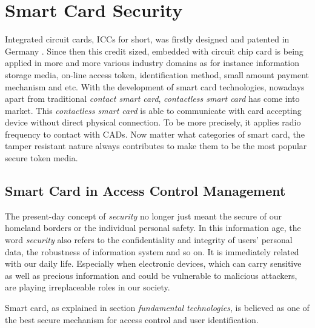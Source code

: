\section{Smart Card Security}
Integrated circuit cards, ICCs for short, was firstly designed and patented in Germany \cite{smart_card_history}. Since then this credit sized, embedded with circuit chip card is being applied in more and more various industry domains as for instance information storage media, on-line access token, identification method, small amount payment mechanism and etc. With the development of smart card technologies, nowadays apart from traditional \emph{contact smart card}, \emph{contactless smart card} \cite{smart_card_contactless} has come into market. This \emph{contactless smart card} is able to communicate with card accepting device without direct physical connection. To be more precisely, it applies radio frequency to contact with CADs. Now matter what categories of smart card, the tamper resistant nature always contributes to make them to be the most popular secure token media.
\subsection{Smart Card in Access Control Management}\label{secSCAC}
The present-day concept of \emph{security} no longer just meant the secure of our homeland borders or the individual personal safety. In this information age, the word \emph{security} also refers to the confidentiality and integrity of users' personal data, the robustness of information system and so on. It is immediately related with our daily life. Especially when electronic devices, which can carry sensitive as well as precious information and could be vulnerable to malicious attackers, are playing irreplaceable roles in our society. 

Smart card, as explained in section \emph{fundamental technologies}, is believed as one of the best secure mechanism for access control and user identification. 

